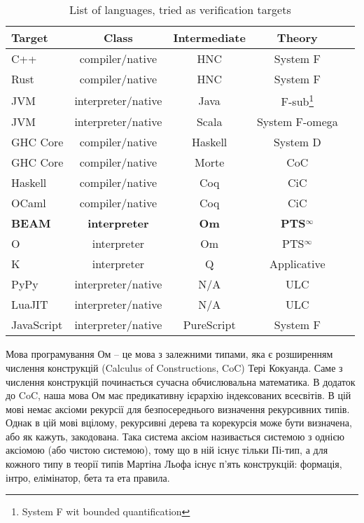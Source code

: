 \begin{definition}
\begin{definition}
\begin{definition}
\begin{definition}
\begin{table}[h]
\begin{center}
\caption{List of languages, tried as verification targets}
\label{tab:a}
\begin{tabular}{lcccc}
\hline
{\bf Target} & {\bf Class} & {\bf Intermediate} & {\bf Theory}\\
\hline
C++        & compiler/native      & HNC & System F\\
Rust       & compiler/native      & HNC & System F\\
JVM        & interpreter/native   & Java    & F-sub\footnote{System F wit bounded quantification}\\
JVM        & interpreter/native   & Scala   & System F-omega\\
GHC Core   & compiler/native      & Haskell & System D\\
GHC Core   & compiler/native      & Morte   & CoC\\
Haskell    & compiler/native      & Coq     & CiC\\
OCaml      & compiler/native      & Coq     & CiC\\
{\bf BEAM} & {\bf interpreter} & {\bf Om}   & {\bf PTS$^\infty$} \\
O          & interpreter          & Om  & PTS$^\infty$ \\
K          & interpreter          & Q   & Applicative \\
PyPy       & interpreter/native   & N/A & ULC \\
LuaJIT     & interpreter/native   & N/A & ULC \\
JavaScript & interpreter/native & PureScript & System F\\
\hline
\end{tabular}
\end{center}
\end{table}

Мова програмування Ом -- це мова з залежними типами, яка є розширенням
числення конструкцій (Calculus of Constructions, CoC) Тері Кокуанда. Саме з числення
конструкцій починається сучасна обчислювальна математика. В додаток до CoC,
наша мова Ом має предикативну ієрархію індексованих всесвітів. В цій мові немає
аксіоми рекурсії для безпосереднього визначення рекурсивних типів. Однак в цій мові
вцілому, рекурсивні дерева та корекурсія може бути визначена, або як кажуть, закодована.
Така система аксіом називається системою з однією аксіомою (або чистою системою), тому що в ній
існує тільки Пі-тип, а для кожного типу в теорії типів Мартіна Льофа існує п'ять
конструкцій: формація, інтро, елімінатор, бета та ета правила.


\end{definition}
\end{definition}
\end{definition}
\end{definition}
